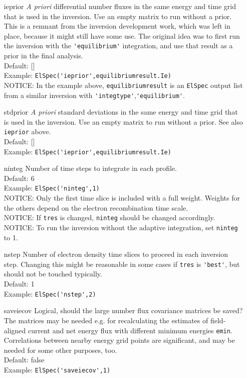 \documentclass[12pt,a4paper]{report}
\begin{document}
\begin{itemize}
\item[ieprior] \emph{A priori} differential number fluxes in the same energy and time grid that is used in the inversion. Use an empty matrix to run without a prior.  This is a remnant from the inversion development work, which was left in place, because it might still have some use. The original idea was to first run the inversion with the \verb|'equilibrium'| integration, and use that result as a prior in the final analysis. \\
Default: []\\
Example: \verb|ElSpec('ieprior',equilibriumresult.Ie)| \\
NOTICE: In the example above, \verb|equilibriumresult| is an \verb|ElSpec| output list from a similar inversion with \verb|'integtype'|,\verb|'equilibrium'|.\\

\item[stdprior] \emph{A priori} standard deviations in the same energy and time grid that is used in the inversion. Use an empty matrix to run without a prior. See also \verb|ieprior| above. \\
Default: [] \\
Example: \verb|ElSpec('ieprior',equilibriumresult.Ie)|\\

\item[ninteg] Number of time steps to integrate in each profile. \\
Default: 6 \\
Example: \verb|ElSpec('ninteg',1)| \\
NOTICE: Only the first time slice is included with a full weight. Weights for the others depend on the electron recombination time scale. \\
NOTICE: If \verb|tres| is changed, \verb|ninteg| should be changed accordingly. \\
NOTICE: To run the inversion without the adaptive integration, set \verb|ninteg| to 1. 

\item[nstep] Number of electron density time slices to proceed in each inversion step. Changing this might be reasonable in some cases if \verb|tres| is \verb|'best'|, but should not be touched typically.\\
Default: 1\\
Example: \verb|ElSpec('nstep',2)|\\

\item[saveiecov] Logical, should the large number flux covariance matrices be saved? The matrices may be needed e.g. for recalculating the estimates of field-aligned current and net energy flux with different minimum energies \verb|emin|. Correlations between nearby energy grid points are significant, and may be needed for some other purposes, too. \\
Default: false\\
Example: \verb|ElSpec('saveiecov',1)|\\


\end{itemize}
\end{document}
